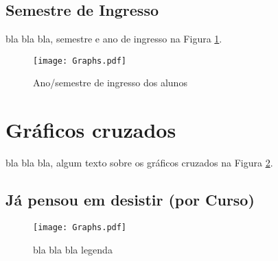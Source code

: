 \documentclass[11pt]{scrartcl} %
\begin{document}
\subsection{Semestre de Ingresso}

bla bla bla, semestre e ano de ingresso na Figura \ref{fig:graph2}.

\begin{figure}[h]
  \centering
  \texttt{[image: Graphs.pdf]}
  \label{fig:graph2}
  \caption{Ano/semestre de ingresso dos alunos}
\end{figure}


\section{Gráficos cruzados}\label{sec:cross}

bla bla bla, algum texto sobre os gráficos cruzados na Figura \ref{fig:graph10}.

\subsection{Já pensou em desistir (por Curso)}

\begin{figure}[h]
  \centering
  \texttt{[image: Graphs.pdf]}
  \label{fig:graph10}
  \caption{bla bla bla legenda}
\end{figure}

\end{document}
